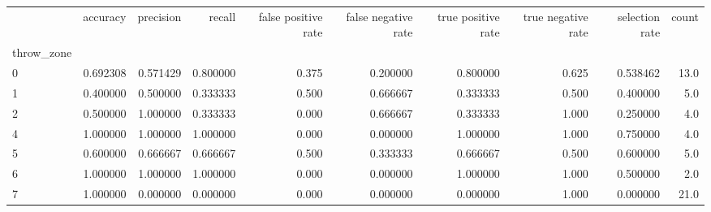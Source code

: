 \begin{tabular}{lrrrrrrrrr}
\toprule
{} &  accuracy &  precision &    recall &  false positive rate &  false negative rate &  true positive rate &  true negative rate &  selection rate &  count \\
throw\_zone &           &            &           &                      &                      &                     &                     &                 &        \\
\midrule
0          &  0.692308 &   0.571429 &  0.800000 &                0.375 &             0.200000 &            0.800000 &               0.625 &        0.538462 &   13.0 \\
1          &  0.400000 &   0.500000 &  0.333333 &                0.500 &             0.666667 &            0.333333 &               0.500 &        0.400000 &    5.0 \\
2          &  0.500000 &   1.000000 &  0.333333 &                0.000 &             0.666667 &            0.333333 &               1.000 &        0.250000 &    4.0 \\
4          &  1.000000 &   1.000000 &  1.000000 &                0.000 &             0.000000 &            1.000000 &               1.000 &        0.750000 &    4.0 \\
5          &  0.600000 &   0.666667 &  0.666667 &                0.500 &             0.333333 &            0.666667 &               0.500 &        0.600000 &    5.0 \\
6          &  1.000000 &   1.000000 &  1.000000 &                0.000 &             0.000000 &            1.000000 &               1.000 &        0.500000 &    2.0 \\
7          &  1.000000 &   0.000000 &  0.000000 &                0.000 &             0.000000 &            0.000000 &               1.000 &        0.000000 &   21.0 \\
\bottomrule
\end{tabular}
